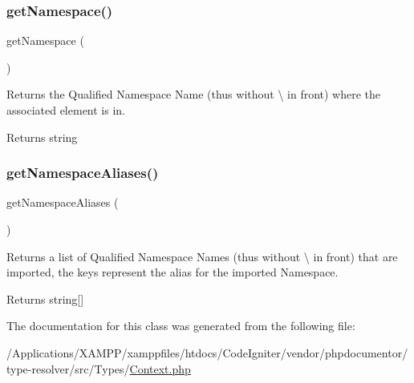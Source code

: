 \subsubsection{\texorpdfstring{get\+Namespace()}{getNamespace()}}
{\footnotesize\ttfamily get\+Namespace (\begin{DoxyParamCaption}{ }\end{DoxyParamCaption})}

Returns the Qualified Namespace Name (thus without {\ttfamily \textbackslash{}} in front) where the associated element is in.

\begin{DoxyReturn}{Returns}
string 
\end{DoxyReturn}
\mbox{\label{classphp_documentor_1_1_reflection_1_1_types_1_1_context_a71755ccbbbe1fb3ccd7446448d8e2e04}} 
\subsubsection{\texorpdfstring{get\+Namespace\+Aliases()}{getNamespaceAliases()}}
{\footnotesize\ttfamily get\+Namespace\+Aliases (\begin{DoxyParamCaption}{ }\end{DoxyParamCaption})}

Returns a list of Qualified Namespace Names (thus without {\ttfamily \textbackslash{}} in front) that are imported, the keys represent the alias for the imported Namespace.

\begin{DoxyReturn}{Returns}
string\mbox{[}\mbox{]} 
\end{DoxyReturn}


The documentation for this class was generated from the following file\+:\begin{DoxyCompactItemize}
\item 
/\+Applications/\+X\+A\+M\+P\+P/xamppfiles/htdocs/\+Code\+Igniter/vendor/phpdocumentor/type-\/resolver/src/\+Types/\mbox{\hyperlink{phpdocumentor_2type-resolver_2src_2_types_2_context_8php}{Context.\+php}}\end{DoxyCompactItemize}
